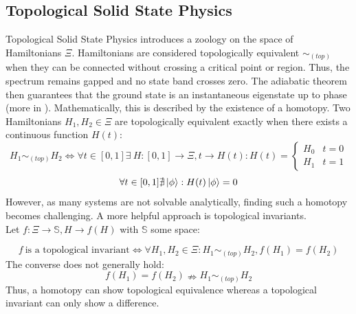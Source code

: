 \documentclass[Master]{subfiles}
\begin{document}
\subsection{Topological Solid State Physics}
Topological Solid State Physics introduces a zoology on the space of Hamiltonians $\Xi$.
Hamiltonians are considered topologically equivalent $\sim_{(top)}$ when they can be connected without crossing a critical point or region. Thus, the spectrum remains gapped and no state band crosses zero. The adiabatic theorem \cite{born1928beweis} then guarantees that the ground state is an instantaneous eigenstate up to phase (more in ). 
Mathematically, this is described by the existence of a homotopy. Two Hamiltonians $H_1, H_2 \in \Xi$ are topologically equivalent exactly when there exists a continuous function $H(t)$:
$$ H_1 \sim_{(top)} H_2 \iff \forall t \in [0,1] \exists  \  H : [0,1] \rightarrow  \Xi, t \rightarrow H(t) :
H(t) = \begin{cases}
H_0 & t = 0 \\
H_1 & t = 1
\end{cases}
$$
$$\forall t \in [0,1] \nexists \ket{\phi} : H(t)\ket{\phi} = 0 $$
However, as many systems are not solvable analytically, finding such a homotopy becomes challenging. A more helpful approach is topological invariants.\\
Let $ f: \Xi \rightarrow \mathbb{S}, H \rightarrow f(H) $ with $\mathbb{S}$ some space:

$$f \ \text{is a topological invariant}  \iff  \forall H_1,H_2 \in \Xi: H_1 \sim_{(top)} H_2 , f(H_1) = f(H_2)$$
The converse does not generally hold:
$$
f(H_1) = f(H_2) \nRightarrow  H_1 \sim_{(top)} H_2 
$$
Thus, a homotopy can show topological equivalence whereas a topological invariant can only show a difference.
\end{document}
